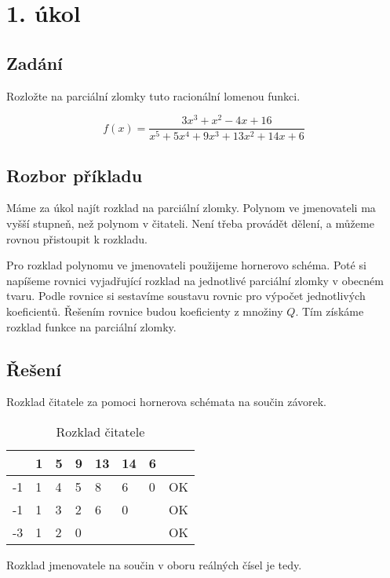 \section{1. úkol}

\subsection{Zadání}
Rozložte na parciální zlomky tuto racionální lomenou funkci.

\begin{displaymath}
f(x)=\frac{3x^3+x^2-4x+16}{x^5+5x^4+9x^3+13x^2+14x+6}
\end{displaymath}

\subsection{Rozbor příkladu}
Máme za úkol najít rozklad na parciální zlomky. Polynom ve jmenovateli ma vyšší stupneň, než polynom v čitateli. Není třeba provádět dělení, a můžeme rovnou přistoupit k rozkladu.

Pro rozklad polynomu ve jmenovateli použijeme hornerovo schéma. Poté si napíšeme rovnici vyjadřující rozklad na jednotlivé parciální zlomky v obecném tvaru. Podle rovnice si sestavíme soustavu rovnic pro výpočet jednotlivých koeficientů. Řešením rovnice budou koeficienty z množiny $Q$. Tím získáme rozklad funkce na parciální zlomky.

\subsection{Řešení}

Rozklad čitatele za pomoci hornerova schémata na součin závorek.

	\begin{table}[htb]
	\centering
	
	\begin{tabular}{|l|l|l|l|l|l|l|l|}
	\hline
		 & 1 & 5 & 9 & 13 & 14 & 6 &    \\ \hline
	  -1 & 1 & 4 & 5 & 8  & 6  & 0 & OK \\ \hline
	  -1 & 1 & 3 & 2 & 6  & 0  &   & OK \\ \hline
	  -3 & 1 & 2 & 0 &    &    &   & OK \\ 
	\hline
	\end{tabular}
	\caption{Rozklad čitatele}
	\end{table}


Rozklad jmenovatele na součin v oboru reálných čísel je tedy. 

